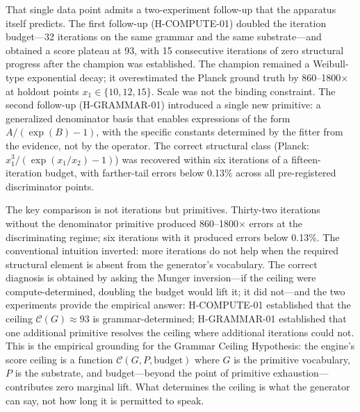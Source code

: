 \documentclass[11pt]{article}
\begin{document}
That single data point admits a two-experiment follow-up that the apparatus itself predicts. The first follow-up (H-COMPUTE-01) doubled the iteration budget---32 iterations on the same grammar and the same substrate---and obtained a score plateau at 93, with 15 consecutive iterations of zero structural progress after the champion was established. The champion remained a Weibull-type exponential decay; it overestimated the Planck ground truth by 860--1800$\times$ at holdout points $x_1 \in \{10, 12, 15\}$. Scale was not the binding constraint. The second follow-up (H-GRAMMAR-01) introduced a single new primitive: a generalized denominator basis that enables expressions of the form $A / (\exp(B) - 1)$, with the specific constants determined by the fitter from the evidence, not by the operator. The correct structural class (Planck: $x_1^3 / (\exp(x_1/x_2) - 1)$) was recovered within six iterations of a fifteen-iteration budget, with farther-tail errors below 0.13\% across all pre-registered discriminator points.

The key comparison is not iterations but primitives. Thirty-two iterations without the denominator primitive produced 860--1800$\times$ errors at the discriminating regime; six iterations with it produced errors below 0.13\%. The conventional intuition inverted: more iterations do not help when the required structural element is absent from the generator's vocabulary. The correct diagnosis is obtained by asking the Munger inversion---if the ceiling were compute-determined, doubling the budget would lift it; it did not---and the two experiments provide the empirical answer: H-COMPUTE-01 established that the ceiling $\mathcal{C}(G) \approx 93$ is grammar-determined; H-GRAMMAR-01 established that one additional primitive resolves the ceiling where additional iterations could not. This is the empirical grounding for the Grammar Ceiling Hypothesis: the engine's score ceiling is a function $\mathcal{C}(G, P, \text{budget})$ where $G$ is the primitive vocabulary, $P$ is the substrate, and budget---beyond the point of primitive exhaustion---contributes zero marginal lift. What determines the ceiling is what the generator can say, not how long it is permitted to speak.
\end{document}
